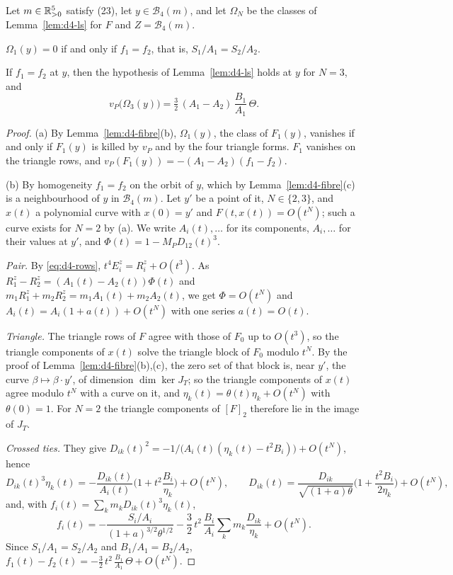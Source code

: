 \begin{lemma}\label{lem:d4-obstr}
Let $m\in\mathbb{R}_{>0}^5$ satisfy (23), let $y\in\mathcal B_4(m)$, and let $\Omega_N$ be the classes of
Lemma~\ref{lem:d4-ls} for $F$ and $Z=\mathcal B_4(m)$.
\begin{alphalist}
  \item $\Omega_1(y)=0$ if and only if $f_1=f_2$, that is, $S_1/A_1=S_2/A_2$.
  \item If $f_1=f_2$ at $y$, then the hypothesis of Lemma~\ref{lem:d4-ls} holds at $y$ for
  $N=3$, and
  \[
    v_P\big(\Omega_3(y)\big)=\tfrac32\,(A_1-A_2)\,\frac{B_1}{A_1}\,\Theta .
  \]
\end{alphalist}
\end{lemma}

\begin{proof}
(a) By Lemma~\ref{lem:d4-fibre}(b), $\Omega_1(y)$, the class of $F_1(y)$, vanishes if and only if
$F_1(y)$ is killed by $v_P$ and by the four triangle forms.  $F_1$ vanishes on the triangle
rows, and $v_P(F_1(y))=-(A_1-A_2)(f_1-f_2)$.

(b) By homogeneity $f_1=f_2$ on the orbit of $y$, which by Lemma~\ref{lem:d4-fibre}(c) is a
neighbourhood of $y$ in $\mathcal B_4(m)$.  Let $y'$ be a point of it, $N\in\{2,3\}$, and $x(t)$
a polynomial curve with $x(0)=y'$ and $F(t,x(t))=O(t^N)$; such a curve exists for $N=2$ by (a).
We write $A_i(t),\dots$ for its components, $A_i,\dots$ for their values at $y'$, and
$\Phi(t)=1-M_PD_{12}(t)^3$.

\emph{Pair.}  By \eqref{eq:d4-rows}, $t^4E^z_i=R^z_i+O(t^3)$.  As $R^z_1-R^z_2=(A_1(t)-A_2(t))\Phi(t)$
and $m_1R^z_1+m_2R^z_2=m_1A_1(t)+m_2A_2(t)$, we get $\Phi=O(t^N)$ and $A_i(t)=A_i(1+a(t))+O(t^N)$
with one series $a(t)=O(t)$.

\emph{Triangle.}  The triangle rows of $F$ agree with those of $F_0$ up to $O(t^3)$, so the
triangle components of $x(t)$ solve the triangle block of $F_0$ modulo $t^N$.  By the proof of
Lemma~\ref{lem:d4-fibre}(b),(c), the zero set of that block is, near $y'$, the curve
$\beta\mapsto\beta\cdot y'$, of dimension $\dim\ker J_T$; so the triangle components of $x(t)$
agree modulo $t^N$ with a curve on it, and $\eta_k(t)=\theta(t)\eta_k+O(t^N)$ with $\theta(0)=1$.
For $N=2$ the triangle components of $[F]_2$ therefore lie in the image of $J_T$.

\emph{Crossed ties.}  They give $D_{ik}(t)^2=-1/\big(A_i(t)(\eta_k(t)-t^2B_i)\big)+O(t^N)$, hence
\[
  D_{ik}(t)^3\eta_k(t)=-\frac{D_{ik}(t)}{A_i(t)}\Big(1+t^2\frac{B_i}{\eta_k}\Big)+O(t^N),\qquad
  D_{ik}(t)=\frac{D_{ik}}{\sqrt{(1+a)\theta}}\Big(1+\frac{t^2B_i}{2\eta_k}\Big)+O(t^N),
\]
and, with $f_i(t)=\sum_km_kD_{ik}(t)^3\eta_k(t)$,
\[
  f_i(t)=-\frac{S_i/A_i}{(1+a)^{3/2}\theta^{1/2}}-\frac32\,t^2\,\frac{B_i}{A_i}\sum_km_k\frac{D_{ik}}{\eta_k}
  +O(t^N).
\]
Since $S_1/A_1=S_2/A_2$ and $B_1/A_1=B_2/A_2$, $f_1(t)-f_2(t)=-\frac32\,t^2\,\frac{B_1}{A_1}\,\Theta+O(t^N)$.


\end{proof}
